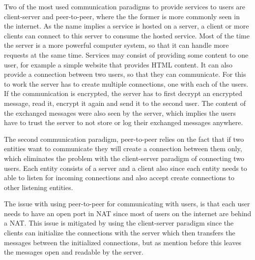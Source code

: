 Two of the most used communication paradigms to provide services to users are client-server and peer-to-peer, where the the former is more commonly seen in the internet. As the name implies a service is hosted on a server, a client or more clients can connect to this server to consume the hosted service. Most of the time the server is a more powerful computer system, so that it can handle more requests at the same time. Services may consist of providing some content to one user, for example a simple website that provides HTML content. It can also provide a connection between two users, so that they can communicate. For this to work the server has to create multiple connections, one with each of the users. If the communication is encrypted, the server has to first decrypt an encrypted message, read it, encrypt it again and send it to the second user. The content of the exchanged messages were also seen by the server, which implies the users have to trust the server to not store or log their exchanged messages anywhere.

The second communication paradigm, peer-to-peer relies on the fact that if two entities want to communicate they will create a connection between them only, which eliminates the problem with the client-server paradigm of connecting two users. Each entity consists of a server and a client also since each entity needs to able to listen for incoming connections and also accept create connections to other listening entities.

The issue with using peer-to-peer for communicating with users, is that each user needs to have an open port in NAT since most of users on the internet are behind a NAT. This issue is mitigated by using the client-server paradigm since the clients can initialize the connections with the server which then transfers the messages between the initialized connections, but as mention before this leaves the messages open and readable by the server. 

